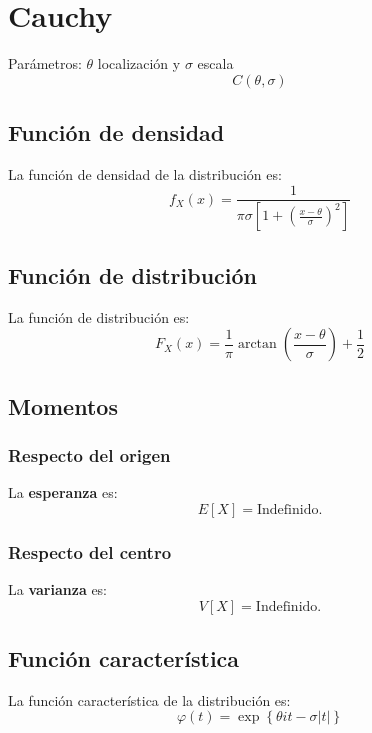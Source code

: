 \section{Cauchy}
\label{sec:cauchy}
Parámetros: $\theta$ localización y $\sigma$ escala
\[
\boxed{C\left( \theta, \sigma \right)}
\]

\subsection{Función de densidad}
La función de densidad de la distribución es:
\[
f_X \left( x \right) = \frac{1}{\pi \sigma \left[ 1 + \left( \frac{x - \theta}{\sigma} \right)^2 \right]}
\]

\subsection{Función de distribución}
La función de distribución es:
\[
F_X\left( x \right) = \frac{1}{\pi} \arctan \left( \frac{x - \theta}{\sigma} \right) + \frac{1}{2}
\]

\subsection{Momentos}

\subsubsection*{Respecto del origen}
La \textbf{esperanza} es: 
\[
    E\left[ X \right] = \text{Indefinido.}
\]
\subsubsection*{Respecto del centro}
La \textbf{varianza} es:
\[
    V\left[ X \right] = \text{Indefinido.} 
\]

\subsection{Función característica}
La función característica de la distribución es:
\[
\varphi\left( t \right) = \exp\left\{ \theta i t - \sigma \lvert t \rvert \right\}
\]

